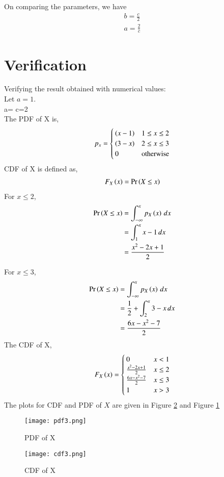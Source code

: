 \documentclass[journal,12pt,twocolumn]{IEEEtran}
\begin{document}
On comparing the parameters, we have
\begin{align}
    b=\frac{c}{2}\\
    a=\frac{2}{c}
\end{align}
\section*{Verification}
Verifying the result obtained with numerical values:\\
Let $a=1$.\\
\because a= \implies c=2\\

The PDF of X is,
\begin{align}
p_x = 
\begin{cases}
\left(x-1\right) & 1 \le x \le 2\\
\left(3-x\right) & 2 \le x \le 3 \\
0 & \text{otherwise}
\end{cases}
\end{align}
CDF of X is defined as,
\begin{align}
    F_X\left(x\right)=\Pr\left(X \le x\right)
\end{align}
For $x \le 2$,
\begin{align}
    \Pr\left(X \le x\right)& = \int_{- \infty}^{x} p_X\left(x\right) \,dx\\
    & = \int_{1}^{x} x-1 \,dx\\
    & = \frac{x^2-2x+1}{2}
\end{align}

For $x \le 3$,
\begin{align}
    \Pr\left(X \le x\right)& = \int_{- \infty}^{x} p_X\left(x\right) \,dx\\
    & = \frac{1}{2} + \int_{2}^{x} 3-x \,dx\\
    & = \frac{6x-x^2-7}{2}
\end{align}
The CDF of X,
\begin{align}
F_X\left(x\right) = 
\begin{cases}
0 & x < 1\\
\frac{x^2-2x+1}{2} &  x \le 2\\
\frac{6x-x^2-7}{2} & x \le 3 \\
1 & x > 3
\end{cases}
\end{align}
The plots for CDF and PDF of $X$ are given in Figure \ref{fig:cdf3} and Figure \ref{fig:pdf3}
\begin{figure}[h!]
\centering
\texttt{[image: pdf3.png]}
\caption{PDF of X}
\label{fig:pdf3}
\end{figure}
\begin{figure}[h!]
\centering
\texttt{[image: cdf3.png]}
\caption{CDF of X}
\label{fig:cdf3}
\end{figure}
\end{document}

